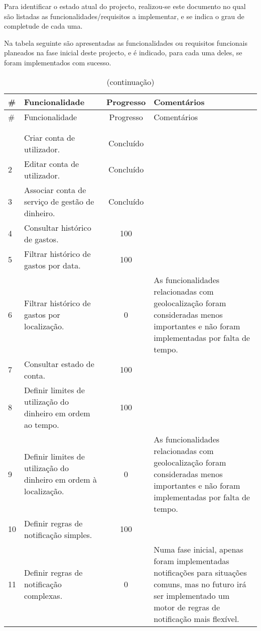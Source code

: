 Para identificar o estado atual do projecto, realizou-se este documento no qual são listadas as funcionalidades/requisitos a implementar, e se indica o grau de completude de cada uma.

Na tabela seguinte são apresentadas as funcionalidades ou requisitos funcionais planeados na fase inicial deste projecto, e é indicado, para cada uma deles, se foram implementados com sucesso.

\begin{center}
\begin{longtable}{@{}lp{}cp{}@{}}
    \toprule \#  & Funcionalidade    & Progresso    & Comentários \\ \midrule
    \endfirsthead
    \toprule \#  & Funcionalidade    & Progresso    & Comentários \\ \midrule
    \endhead
    \bottomrule
    \caption{Caption}\label{tab:func}\\%
    \endfoot
    \bottomrule
    \caption[]{(continuação)}\\%
    \endlastfoot
    1   & Criar conta de utilizador.  & Concluído  &  \\
    2   & Editar conta de utilizador.  & Concluído  &  \\
    3   & Associar conta de serviço de gestão de dinheiro.  & Concluído  &  \\
    4   & Consultar histórico de gastos.  & 100  &  \\
    5   & Filtrar histórico de gastos por data.  & 100  &  \\
    6   & Filtrar histórico de gastos por localização.  & 0  & As funcionalidades relacionadas com geolocalização foram consideradas menos importantes e não foram implementadas por falta de tempo. \\
    7   & Consultar estado de conta.  & 100  &  \\
    8   & Definir limites de utilização do dinheiro em ordem ao tempo.  & 100  &  \\
    9   & Definir limites de utilização do dinheiro em ordem à localização.  & 0  & As funcionalidades relacionadas com geolocalização foram consideradas menos importantes e não foram implementadas por falta de tempo. \\
    10  & Definir regras de notificação simples.  & 100  &  \\
    11  & Definir regras de notificação complexas.  & 0  & Numa fase inicial, apenas foram implementadas notificações para situações comuns, mas no futuro irá ser implementado um motor de regras de notificação mais flexível. \\

\end{longtable}
\end{center}
